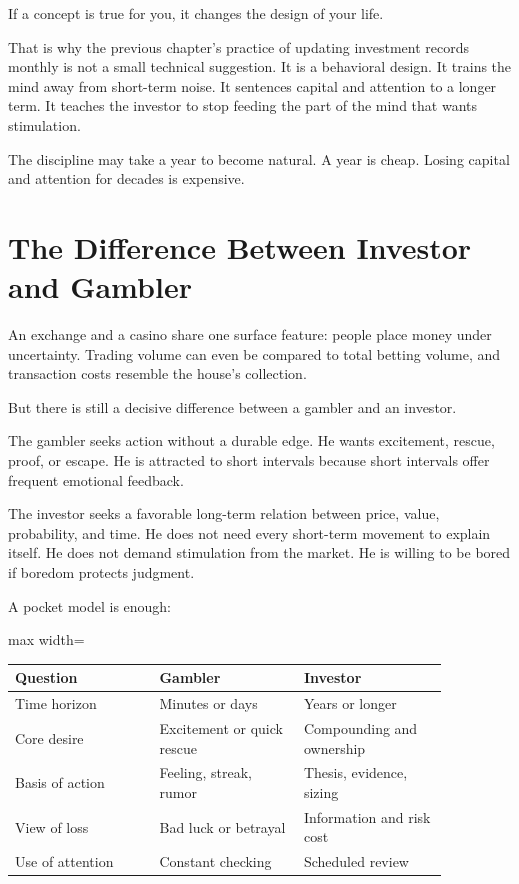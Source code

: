 If a concept is true for you, it changes the design of your life.

That is why the previous chapter's practice of updating investment records monthly is not a small technical suggestion. It is a behavioral design. It trains the mind away from short-term noise. It sentences capital and attention to a longer term. It teaches the investor to stop feeding the part of the mind that wants stimulation.

The discipline may take a year to become natural. A year is cheap. Losing capital and attention for decades is expensive.

\section*{The Difference Between Investor and Gambler}

An exchange and a casino share one surface feature: people place money under uncertainty. Trading volume can even be compared to total betting volume, and transaction costs resemble the house's collection.

But there is still a decisive difference between a gambler and an investor.

The gambler seeks action without a durable edge. He wants excitement, rescue, proof, or escape. He is attracted to short intervals because short intervals offer frequent emotional feedback.

The investor seeks a favorable long-term relation between price, value, probability, and time. He does not need every short-term movement to explain itself. He does not demand stimulation from the market. He is willing to be bored if boredom protects judgment.

A pocket model is enough:

\begin{center}
\begin{adjustbox}{max width=\linewidth}
\begin{tabular}{p{0.28\linewidth}p{0.29\linewidth}p{0.29\linewidth}}
\hline
Question & Gambler & Investor \\
\hline
Time horizon & Minutes or days & Years or longer \\
Core desire & Excitement or quick rescue & Compounding and ownership \\
Basis of action & Feeling, streak, rumor & Thesis, evidence, sizing \\
View of loss & Bad luck or betrayal & Information and risk cost \\
Use of attention & Constant checking & Scheduled review \\
\hline
\end{tabular}
\end{adjustbox}
\end{center}

